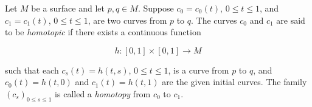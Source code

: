 Let $M$ be a surface and let $p, q \in M$. Suppose $c_0 = c_0(t)$, $0 \leq t \leq 1$, and $c_1 = c_1(t)$, $0 \leq t \leq 1$, are two curves from $p$ to $q$. The curves $c_0$ and $c_1$ are said to be \textit{homotopic} if there exists a continuous function

$$h: [0, 1] \times [0, 1] \to M$$

such that each $c_s(t) = h(t, s)$, $0 \leq t \leq 1$, is a curve from $p$ to $q$, and $c_0(t) = h(t, 0)$ and $c_1(t) = h(t, 1)$ are the given initial curves. The family $(c_s)_{0 \leq s \leq 1}$ is called a \textit{homotopy} from $c_0$ to $c_1$.
